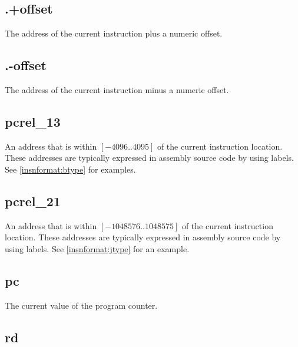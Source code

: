 \subsection{.+offset}

The address of the current instruction plus a numeric offset.

\subsection{.-offset}

The address of the current instruction minus a numeric offset.

\subsection{pcrel\_13}
\label{pcrel.13}

An address that is within $[-4096..4095]$ of the current instruction location.
These addresses are typically expressed in assembly source code by using labels.
See \autoref{insnformat:btype} for examples.

\subsection{pcrel\_21}
\label{pcrel.21}

An address that is within $[-1048576..1048575]$ of the current instruction 
location.  
These addresses are typically expressed in assembly source code by using labels.
See \autoref{insnformat:jtype} for an example.


\subsection{pc}

The current value of the program counter.

\subsection{rd}

